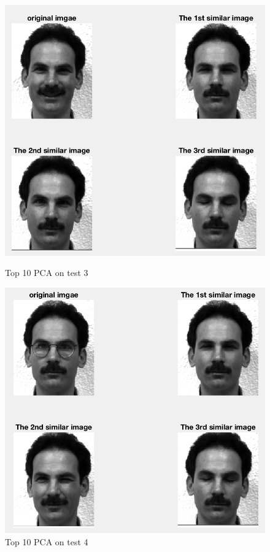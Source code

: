 \documentclass{article}
\begin{document}
\begin{figure}[htbp]
\centering
\begin{minipage}[t]{0.48\textwidth}
\centering
\includegraphics[scale = 0.3]{10_3.png}
\caption{Top 10 PCA on test 3}
\end{minipage}
\begin{minipage}[t]{0.48\textwidth}
\centering
\includegraphics[scale = 0.3]{10_4.png}
\caption{Top 10 PCA on test 4}
\end{minipage}
\end{figure}
\end{document}
